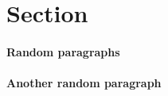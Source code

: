 \documentclass{article}
\begin{document}
\section{Section}
\paragraph{Random paragraphs}
\lipsum[1-5]
\paragraph{Another random paragraph}
\lipsum[6]
\end{document}
